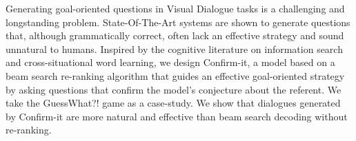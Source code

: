 Generating goal-oriented questions in Visual Dialogue tasks is a challenging and longstanding problem. State-Of-The-Art systems are shown to generate questions that, although grammatically correct, often lack an effective strategy and sound unnatural to humans. Inspired by the cognitive literature on information search and cross-situational word learning, we design Confirm-it, a model based on a beam search re-ranking algorithm that guides an effective goal-oriented strategy by asking questions that confirm the model's conjecture about the referent. We take the GuessWhat?! game as a case-study. We show that dialogues generated by Confirm-it are more natural and effective than beam search decoding without re-ranking.

